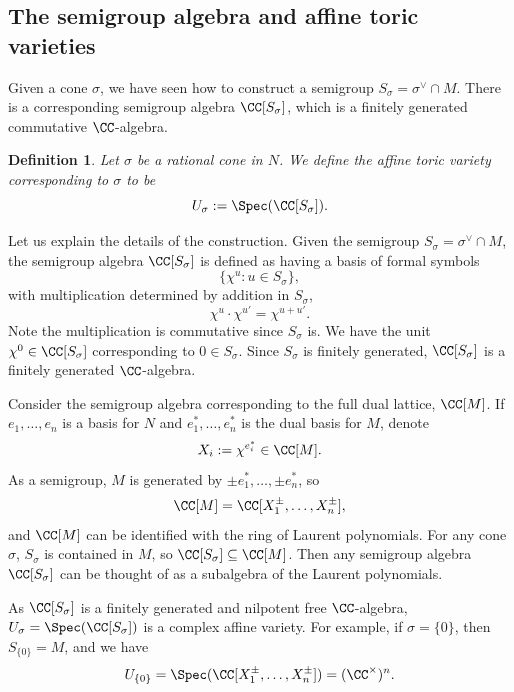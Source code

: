 \documentclass[12pt]{amsart}
\theoremstyle{plain}
\newtheorem{definition}[theorem]{Definition}
\begin{document}
\subsection{The semigroup algebra and affine toric varieties}
Given a cone $\sigma$, we have seen how to construct a semigroup $S_\sigma = \sigma^\vee \cap M$.
There is a corresponding semigroup algebra $\CC[S_\sigma]$, which is a finitely generated commutative $\CC$-algebra.

\begin{definition}
Let $\sigma$ be a rational cone in $N$.
We define the affine toric variety corresponding to $\sigma$ to be
$$U_\sigma := \Spec(\CC[S_\sigma]).$$
\end{definition}

Let us explain the details of the construction.
Given the semigroup $S_\sigma = \sigma^\vee \cap M$, the semigroup algebra $\CC[S_\sigma]$ is defined as having a basis of formal symbols
$$\{\chi^u : u \in S_\sigma\},$$
with multiplication determined by addition in $S_\sigma$,
$$\chi^u \cdot \chi^{u'} = \chi^{u + u'}.$$
Note the multiplication is commutative since $S_\sigma$ is.
We have the unit $\chi^0 \in \CC[S_\sigma]$ corresponding to $0 \in S_\sigma$.
Since $S_\sigma$ is finitely generated, $\CC[S_\sigma]$ is a finitely generated $\CC$-algebra.

Consider the semigroup algebra corresponding to the full dual lattice, $\CC[M]$.
If $e_1, \ldots, e_n$ is a basis for $N$ and $e_1^*, \ldots, e_n^*$ is the dual basis for $M$, denote
$$X_i := \chi^{e_i^*} \in \CC[M].$$
As a semigroup, $M$ is generated by $\pm e_1^*, \ldots, \pm e_n^*$, so
$$\CC[M] = \CC[X_1^\pm, \ldots, X_n^\pm],$$
and $\CC[M]$ can be identified with the ring of Laurent polynomials.
For any cone $\sigma$, $S_\sigma$ is contained in $M$, so $\CC[S_\sigma]\subseteq\CC[M]$. 
Then any semigroup algebra $\CC[S_\sigma]$ can be thought of as a subalgebra of the Laurent polynomials.

As $\CC[S_\sigma]$ is a finitely generated and nilpotent free $\CC$-algebra, $U_\sigma = \Spec(\CC[S_\sigma])$ is a complex affine variety.
For example, if $\sigma = \{0\}$, then $S_{\{0\}}= M$, and we have
$$U_{\{0\}} = \Spec(\CC[X_1^\pm, \ldots, X_n^\pm]) = (\CC^\times)^n.$$
\end{document}
